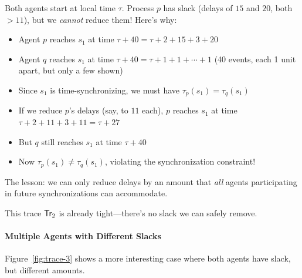 Both agents start at local time $\tau$. Process $p$ has slack (delays of $15$ and $20$, both $> 11$), but we \emph{cannot} reduce them! Here's why:

\begin{itemize}
\item Agent $p$ reaches $s_1$ at time $\tau + 40 = \tau + 2 + 15 + 3 + 20$
\item Agent $q$ reaches $s_1$ at time $\tau + 40 = \tau + 1 + 1 + \cdots + 1$ (40 events, each 1 unit apart, but only a few shown)
\item Since $s_1$ is time-synchronizing, we must have $\tau_p(s_1) = \tau_q(s_1)$

\item If we reduce $p$'s delays (say, to $11$ each), $p$ reaches $s_1$ at time $\tau + 2 + 11 + 3 + 11 = \tau + 27$
\item But $q$ still reaches $s_1$ at time $\tau + 40$
\item Now $\tau_p(s_1) \neq \tau_q(s_1)$, violating the synchronization constraint!
\end{itemize}

The lesson: we can only reduce delays by an amount that \emph{all} agents participating in future synchronizations can accommodate.

This trace $\textsf{Tr}_2$ is already tight---there's no slack we can safely remove.

\paragraph*{Multiple Agents with Different Slacks}

Figure~\ref{fig:trace-3} shows a more interesting case where both agents have slack, but different amounts.

